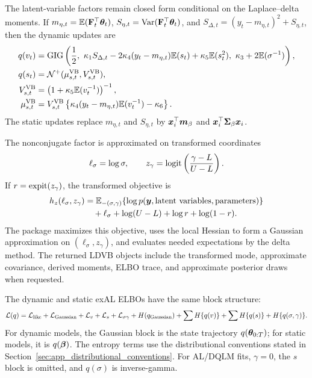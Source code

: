 The latent-variable factors remain closed form conditional on the
Laplace--delta moments. If $m_{\eta,t}=\mathbb{E}(\mathbf{F}_t^\top\boldsymbol{\theta}_t)$,
$S_{\eta,t}=\operatorname{Var}(\mathbf{F}_t^\top\boldsymbol{\theta}_t)$, and
$S_{\Delta,t}=(y_t-m_{\eta,t})^2+S_{\eta,t}$, then the dynamic updates are
\begin{align}
q(v_t)&=\operatorname{GIG}\left(
\frac{1}{2},\
\kappa_1S_{\Delta,t}-2\kappa_4(y_t-m_{\eta,t})\mathbb{E}(s_t)
+\kappa_5\mathbb{E}(s_t^2),\
\kappa_3+2\mathbb{E}(\sigma^{-1})
\right),\\
q(s_t)&=\mathcal{N}^{+}(\mu_{s,t}^{\mathrm{VB}},V_{s,t}^{\mathrm{VB}}),\\
V_{s,t}^{\mathrm{VB}}
&=\left(1+\kappa_5\mathbb{E}(v_t^{-1})\right)^{-1},\\
\mu_{s,t}^{\mathrm{VB}}
&=V_{s,t}^{\mathrm{VB}}
\left\{\kappa_4(y_t-m_{\eta,t})\mathbb{E}(v_t^{-1})-\kappa_6\right\}.
\label{eq:dyn_exdqlm_vb_vs}
\end{align}
The static updates replace $m_{\eta,t}$ and $S_{\eta,t}$ by
$\boldsymbol{x}_i^\top\boldsymbol{m}_\beta$ and
$\boldsymbol{x}_i^\top\mathbf{\Sigma}_\beta\boldsymbol{x}_i$.

The nonconjugate factor is approximated on transformed coordinates
\begin{equation}
\ell_\sigma=\log\sigma,\qquad
z_\gamma=\operatorname{logit}\left(\frac{\gamma-L}{U-L}\right).
\label{eq:dyn_exdqlm_ld_transform}
\end{equation}
If $r=\operatorname{expit}(z_\gamma)$, the transformed objective is
\begin{align}
h_z(\ell_\sigma,z_\gamma)
&=
\mathbb{E}_{-(\sigma,\gamma)}
\{\log p(\boldsymbol{y},\text{latent variables},\text{parameters})\}
\nonumber\\
&\quad
+\ell_\sigma+\log(U-L)+\log r+\log(1-r).
\label{eq:dyn_exdqlm_ld_objective}
\end{align}
The package maximizes this objective, uses the local Hessian to form a
Gaussian approximation on $(\ell_\sigma,z_\gamma)$, and evaluates needed
expectations by the delta method. The returned LDVB objects include the
transformed mode, approximate covariance, derived moments, ELBO trace, and
approximate posterior draws when requested.

The dynamic and static exAL ELBOs have the same block structure:
\begin{equation}
\mathcal{L}(q)=
\mathcal{L}_{\mathrm{like}}+\mathcal{L}_{\mathrm{Gaussian}}
+\mathcal{L}_v+\mathcal{L}_s+\mathcal{L}_{\sigma\gamma}
+H(q_{\mathrm{Gaussian}})
+\sum H\{q(v)\}+\sum H\{q(s)\}+H\{q(\sigma,\gamma)\}.
\label{eq:dyn_exdqlm_elbo}
\end{equation}
For dynamic models, the Gaussian block is the state trajectory
$q(\boldsymbol{\theta}_{0:T})$; for static models, it is $q(\boldsymbol{\beta})$.
The entropy terms use the distributional conventions stated in
Section~\ref{sec:app_distributional_conventions}. For AL/DQLM fits,
$\gamma=0$, the $s$ block is omitted, and $q(\sigma)$ is inverse-gamma.

